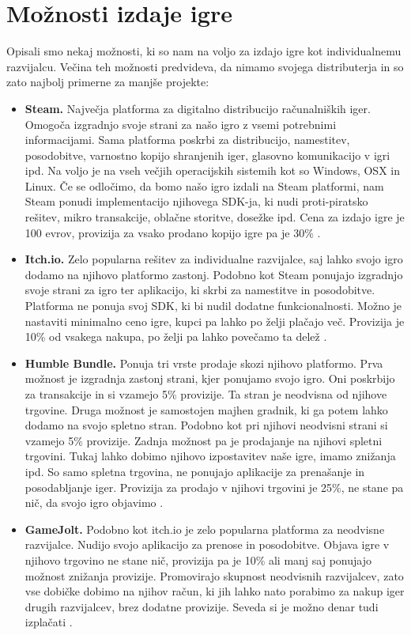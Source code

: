 \documentclass[12pt,a4paper,twoside]{book}
\begin{document}
\section{Možnosti izdaje igre}
Opisali smo nekaj možnosti, ki so nam na voljo za izdajo igre kot individualnemu razvijalcu. Večina teh možnosti predvideva, da nimamo svojega distributerja in so zato najbolj primerne za manjše projekte:
\begin{itemize}
	\item \textbf{Steam.} Največja platforma za digitalno distribucijo računalniških iger. Omogoča izgradnjo svoje strani za našo igro z vsemi potrebnimi informacijami. Sama platforma poskrbi za distribucijo, namestitev, posodobitve, varnostno kopijo shranjenih iger, glasovno komunikacijo v igri ipd. Na voljo je na vseh večjih operacijskih sistemih kot so Windows, OSX in Linux. Če se odločimo, da bomo našo igro izdali na Steam platformi, nam Steam ponudi implementacijo njihovega SDK-ja, ki nudi proti-piratsko rešitev, mikro transakcije, oblačne storitve, dosežke ipd. Cena za izdajo igre je 100 evrov, provizija za vsako prodano kopijo igre pa je 30\% \cite{steam}.
	\item \textbf{Itch.io.} Zelo popularna rešitev za individualne razvijalce, saj lahko svojo igro dodamo na njihovo platformo zastonj. Podobno kot Steam ponujajo izgradnjo svoje strani za igro ter aplikacijo, ki skrbi za namestitve in posodobitve. Platforma ne ponuja svoj SDK, ki bi nudil dodatne funkcionalnosti. Možno je nastaviti minimalno ceno igre, kupci pa lahko po želji plačajo več. Provizija je 10\% od vsakega nakupa, po želji pa lahko povečamo ta delež \cite{itchiofaq}.
	\item \textbf{Humble Bundle.} Ponuja tri vrste prodaje skozi njihovo platformo. Prva možnost je izgradnja zastonj strani, kjer ponujamo svojo igro. Oni poskrbijo za transakcije in si vzamejo 5\% provizije. Ta stran je neodvisna od njihove trgovine. Druga možnost je samostojen majhen gradnik, ki ga potem lahko dodamo na svojo spletno stran. Podobno kot pri njihovi neodvisni strani si vzamejo 5\% provizije. Zadnja možnost pa je prodajanje na njihovi spletni trgovini. Tukaj lahko dobimo njihovo izpostavitev naše igre, imamo znižanja ipd. So samo spletna trgovina, ne ponujajo aplikacije za prenašanje in posodabljanje iger. Provizija za prodajo v njihovi trgovini je 25\%, ne stane pa nič, da svojo igro objavimo \cite{humblebundle}.
	\item \textbf{GameJolt.} Podobno kot itch.io je zelo popularna platforma za neodvisne razvijalce. Nudijo svojo aplikacijo za prenose in posodobitve. Objava igre v njihovo trgovino ne stane nič, provizija pa je 10\% ali manj saj ponujajo možnost znižanja provizije. Promovirajo skupnost neodvisnih razvijalcev, zato vse dobičke dobimo na njihov račun, ki jih lahko nato porabimo za nakup iger drugih razvijalcev, brez dodatne provizije. Seveda si je možno denar tudi izplačati \cite{gamejolt}.

\end{itemize}
\end{document}
